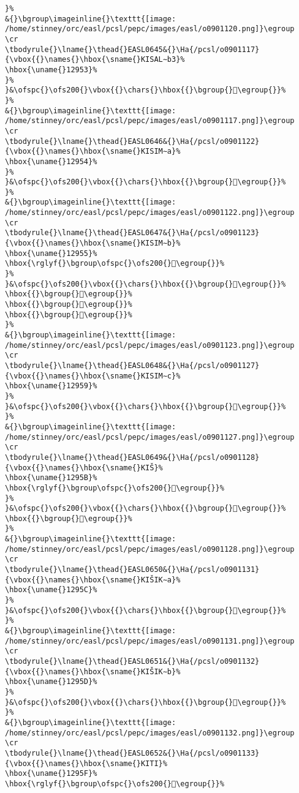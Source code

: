 \begin{verbatim}
}%
&{}\bgroup\imageinline{}\texttt{[image: /home/stinney/orc/easl/pcsl/pepc/images/easl/o0901120.png]}\egroup
\cr
\tbodyrule{}\lname{}\thead{}EASL0645&{}\Ha{/pcsl/o0901117}{\vbox{{}\names{}\hbox{\sname{}KISAL∼b3}%
\hbox{\uname{}12953}%
}%
}&\ofspc{}\ofs200{}\vbox{{}\chars{}\hbox{{}\bgroup{}𒥓\egroup{}}%
}%
&{}\bgroup\imageinline{}\texttt{[image: /home/stinney/orc/easl/pcsl/pepc/images/easl/o0901117.png]}\egroup
\cr
\tbodyrule{}\lname{}\thead{}EASL0646&{}\Ha{/pcsl/o0901122}{\vbox{{}\names{}\hbox{\sname{}KISIM∼a}%
\hbox{\uname{}12954}%
}%
}&\ofspc{}\ofs200{}\vbox{{}\chars{}\hbox{{}\bgroup{}𒥔\egroup{}}%
}%
&{}\bgroup\imageinline{}\texttt{[image: /home/stinney/orc/easl/pcsl/pepc/images/easl/o0901122.png]}\egroup
\cr
\tbodyrule{}\lname{}\thead{}EASL0647&{}\Ha{/pcsl/o0901123}{\vbox{{}\names{}\hbox{\sname{}KISIM∼b}%
\hbox{\uname{}12955}%
\hbox{\rglyf{}\bgroup\ofspc{}\ofs200{}𒥕\egroup{}}%
}%
}&\ofspc{}\ofs200{}\vbox{{}\chars{}\hbox{{}\bgroup{}𒥕\egroup{}}%
\hbox{{}\bgroup{}𒥖\egroup{}}%
\hbox{{}\bgroup{}𒥗\egroup{}}%
\hbox{{}\bgroup{}𒥘\egroup{}}%
}%
&{}\bgroup\imageinline{}\texttt{[image: /home/stinney/orc/easl/pcsl/pepc/images/easl/o0901123.png]}\egroup
\cr
\tbodyrule{}\lname{}\thead{}EASL0648&{}\Ha{/pcsl/o0901127}{\vbox{{}\names{}\hbox{\sname{}KISIM∼c}%
\hbox{\uname{}12959}%
}%
}&\ofspc{}\ofs200{}\vbox{{}\chars{}\hbox{{}\bgroup{}𒥙\egroup{}}%
}%
&{}\bgroup\imageinline{}\texttt{[image: /home/stinney/orc/easl/pcsl/pepc/images/easl/o0901127.png]}\egroup
\cr
\tbodyrule{}\lname{}\thead{}EASL0649&{}\Ha{/pcsl/o0901128}{\vbox{{}\names{}\hbox{\sname{}KIŠ}%
\hbox{\uname{}1295B}%
\hbox{\rglyf{}\bgroup\ofspc{}\ofs200{}𒥛\egroup{}}%
}%
}&\ofspc{}\ofs200{}\vbox{{}\chars{}\hbox{{}\bgroup{}𒥚\egroup{}}%
\hbox{{}\bgroup{}𒥛\egroup{}}%
}%
&{}\bgroup\imageinline{}\texttt{[image: /home/stinney/orc/easl/pcsl/pepc/images/easl/o0901128.png]}\egroup
\cr
\tbodyrule{}\lname{}\thead{}EASL0650&{}\Ha{/pcsl/o0901131}{\vbox{{}\names{}\hbox{\sname{}KIŠIK∼a}%
\hbox{\uname{}1295C}%
}%
}&\ofspc{}\ofs200{}\vbox{{}\chars{}\hbox{{}\bgroup{}𒥜\egroup{}}%
}%
&{}\bgroup\imageinline{}\texttt{[image: /home/stinney/orc/easl/pcsl/pepc/images/easl/o0901131.png]}\egroup
\cr
\tbodyrule{}\lname{}\thead{}EASL0651&{}\Ha{/pcsl/o0901132}{\vbox{{}\names{}\hbox{\sname{}KIŠIK∼b}%
\hbox{\uname{}1295D}%
}%
}&\ofspc{}\ofs200{}\vbox{{}\chars{}\hbox{{}\bgroup{}𒥝\egroup{}}%
}%
&{}\bgroup\imageinline{}\texttt{[image: /home/stinney/orc/easl/pcsl/pepc/images/easl/o0901132.png]}\egroup
\cr
\tbodyrule{}\lname{}\thead{}EASL0652&{}\Ha{/pcsl/o0901133}{\vbox{{}\names{}\hbox{\sname{}KITI}%
\hbox{\uname{}1295F}%
\hbox{\rglyf{}\bgroup\ofspc{}\ofs200{}𒥟\egroup{}}%

\end{verbatim}
